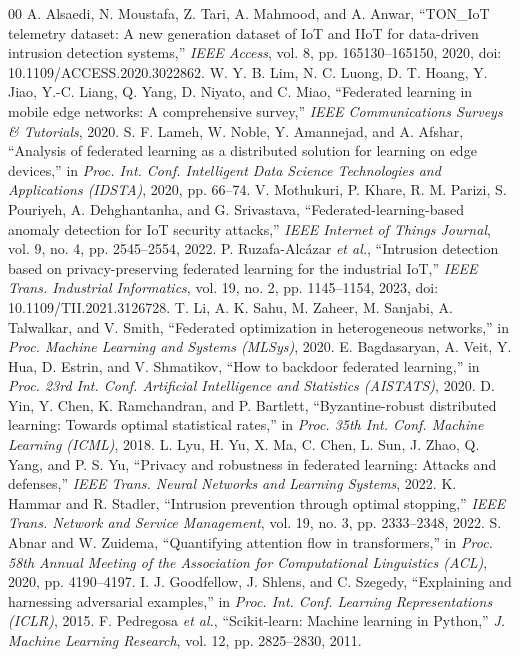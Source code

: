 \documentclass[conference]{IEEEtran}
\begin{document}
\begin{thebibliography}{00}
 A. Alsaedi, N. Moustafa, Z. Tari, A. Mahmood, and A. Anwar, ``TON\_IoT telemetry dataset: A new generation dataset of IoT and IIoT for data-driven intrusion detection systems,'' \textit{IEEE Access}, vol. 8, pp. 165130--165150, 2020, doi: 10.1109/ACCESS.2020.3022862.
 W. Y. B. Lim, N. C. Luong, D. T. Hoang, Y. Jiao, Y.-C. Liang, Q. Yang, D. Niyato, and C. Miao, ``Federated learning in mobile edge networks: A comprehensive survey,'' \textit{IEEE Communications Surveys \& Tutorials}, 2020.
 S. F. Lameh, W. Noble, Y. Amannejad, and A. Afshar, ``Analysis of federated learning as a distributed solution for learning on edge devices,'' in \textit{Proc. Int. Conf. Intelligent Data Science Technologies and Applications (IDSTA)}, 2020, pp. 66--74.
 V. Mothukuri, P. Khare, R. M. Parizi, S. Pouriyeh, A. Dehghantanha, and G. Srivastava, ``Federated-learning-based anomaly detection for IoT security attacks,'' \textit{IEEE Internet of Things Journal}, vol. 9, no. 4, pp. 2545--2554, 2022.
 P. Ruzafa-Alc\'{a}zar \textit{et al.}, ``Intrusion detection based on privacy-preserving federated learning for the industrial IoT,'' \textit{IEEE Trans. Industrial Informatics}, vol. 19, no. 2, pp. 1145--1154, 2023, doi: 10.1109/TII.2021.3126728.
 T. Li, A. K. Sahu, M. Zaheer, M. Sanjabi, A. Talwalkar, and V. Smith, ``Federated optimization in heterogeneous networks,'' in \textit{Proc. Machine Learning and Systems (MLSys)}, 2020.
 E. Bagdasaryan, A. Veit, Y. Hua, D. Estrin, and V. Shmatikov, ``How to backdoor federated learning,'' in \textit{Proc. 23rd Int. Conf. Artificial Intelligence and Statistics (AISTATS)}, 2020.
 D. Yin, Y. Chen, K. Ramchandran, and P. Bartlett, ``Byzantine-robust distributed learning: Towards optimal statistical rates,'' in \textit{Proc. 35th Int. Conf. Machine Learning (ICML)}, 2018.
 L. Lyu, H. Yu, X. Ma, C. Chen, L. Sun, J. Zhao, Q. Yang, and P. S. Yu, ``Privacy and robustness in federated learning: Attacks and defenses,'' \textit{IEEE Trans. Neural Networks and Learning Systems}, 2022.
 K. Hammar and R. Stadler, ``Intrusion prevention through optimal stopping,'' \textit{IEEE Trans. Network and Service Management}, vol. 19, no. 3, pp. 2333--2348, 2022.
 S. Abnar and W. Zuidema, ``Quantifying attention flow in transformers,'' in \textit{Proc. 58th Annual Meeting of the Association for Computational Linguistics (ACL)}, 2020, pp. 4190--4197.
 I. J. Goodfellow, J. Shlens, and C. Szegedy, ``Explaining and harnessing adversarial examples,'' in \textit{Proc. Int. Conf. Learning Representations (ICLR)}, 2015.
 F. Pedregosa \textit{et al.}, ``Scikit-learn: Machine learning in Python,'' \textit{J. Machine Learning Research}, vol. 12, pp. 2825--2830, 2011.
\end{thebibliography}
\end{document}
